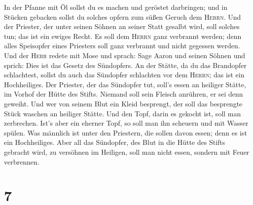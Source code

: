  In der Pfanne mit Öl sollst du es machen und geröstet
darbringen; und in Stücken gebacken sollst du solches opfern zum süßen
Geruch dem \textsc{Herrn}.  Und der Priester, der unter
seinen Söhnen an seiner Statt gesalbt wird, soll solches tun; das ist
ein ewiges Recht. Es soll dem \textsc{Herrn} ganz verbrannt werden;
 denn alles Speisopfer eines Priesters soll ganz
verbrannt und nicht gegessen werden.  Und der
\textsc{Herr} redete mit Mose und sprach:  Sage Aaron und
seinen Söhnen und sprich: Dies ist das Gesetz des Sündopfers. An der
Stätte, da du das Brandopfer schlachtest, sollst du auch das Sündopfer
schlachten vor dem \textsc{Herrn}; das ist ein Hochheiliges.
 Der Priester, der das Sündopfer tut, soll's essen an
heiliger Stätte, im Vorhof der Hütte des Stifts.  Niemand
soll sein Fleisch anrühren, er sei denn geweiht. Und wer von seinem Blut
ein Kleid besprengt, der soll das besprengte Stück waschen an heiliger
Stätte.  Und den Topf, darin es gekocht ist, soll man
zerbrechen. Ist's aber ein eherner Topf, so soll man ihn scheuern und
mit Wasser spülen.  Was männlich ist unter den Priestern,
die sollen davon essen; denn es ist ein Hochheiliges. 
Aber all das Sündopfer, des Blut in die Hütte des Stifts gebracht wird,
zu versöhnen im Heiligen, soll man nicht essen, sondern mit Feuer
verbrennen.

\hypertarget{section-6}{%
\section{7}\label{section-6}}

